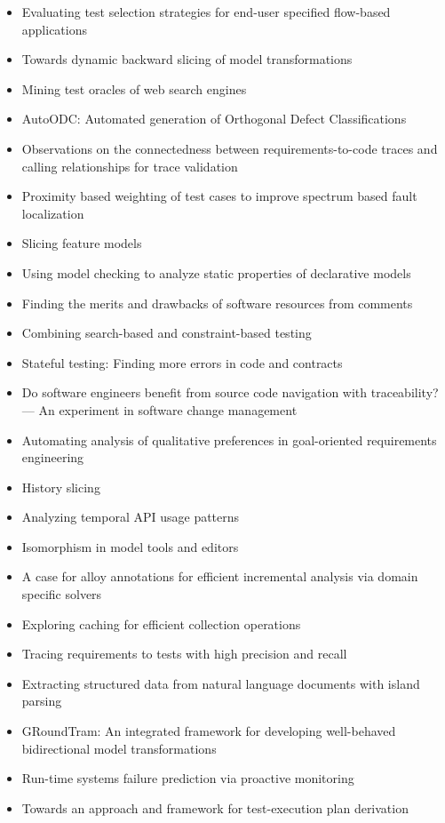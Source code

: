{\begin{itemize}[itemsep=-1ex]
  \item Evaluating test selection strategies for end-user specified flow-based applications
  \item Towards dynamic backward slicing of model transformations
  \item Mining test oracles of web search engines
  \item AutoODC: Automated generation of Orthogonal Defect Classifications
  \item Observations on the connectedness between requirements-to-code traces and calling relationships for trace validation
  \item Proximity based weighting of test cases to improve spectrum based fault localization
  \item Slicing feature models
  \item Using model checking to analyze static properties of declarative models
  \item Finding the merits and drawbacks of software resources from comments
  \item Combining search-based and constraint-based testing
  \item Stateful testing: Finding more errors in code and contracts
  \item Do software engineers benefit from source code navigation with traceability? — An experiment in software change management
  \item Automating analysis of qualitative preferences in goal-oriented requirements engineering
  \item History slicing
  \item Analyzing temporal API usage patterns
  \item Isomorphism in model tools and editors
  \item A case for alloy annotations for efficient incremental analysis via domain specific solvers
  \item Exploring caching for efficient collection operations
  \item Tracing requirements to tests with high precision and recall
  \item Extracting structured data from natural language documents with island parsing
  \item GRoundTram: An integrated framework for developing well-behaved bidirectional model transformations
  \item Run-time systems failure prediction via proactive monitoring
  \item Towards an approach and framework for test-execution plan derivation

\end{itemize}}
